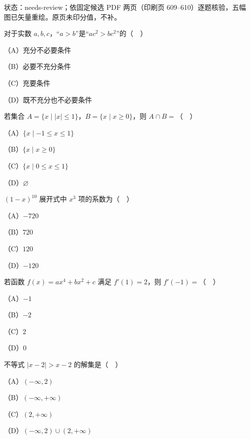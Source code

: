 

状态：needs-review；依固定候选 PDF 两页（印刷页 609–610）逐题核验，五幅图已矢量重绘。原页未印分值，不补。


\begin{question}
对于实数 $a,b,c$，“$a>b$”是“$ac^2>bc^2$”的（　）

（A）充分不必要条件

（B）必要不充分条件

（C）充要条件

（D）既不充分也不必要条件

\end{question}
\begin{question}
若集合 $A=\{x\mid |x|\leqslant1\}$，$B=\{x\mid x\geqslant0\}$，则 $A\cap B=$（　）

（A）$\{x\mid -1\leqslant x\leqslant1\}$

（B）$\{x\mid x\geqslant0\}$

（C）$\{x\mid 0\leqslant x\leqslant1\}$

（D）$\varnothing$

\end{question}
\begin{question}
$(1-x)^{10}$ 展开式中 $x^3$ 项的系数为（　）

（A）$-720$

（B）$720$

（C）$120$

（D）$-120$

\end{question}
\begin{question}
若函数 $f(x)=ax^4+bx^2+c$ 满足 $f'(1)=2$，则 $f'(-1)=$（　）

（A）$-1$

（B）$-2$

（C）$2$

（D）$0$

\end{question}
\begin{question}
不等式 $|x-2|>x-2$ 的解集是（　）

（A）$(-\infty,2)$

（B）$(-\infty,+\infty)$

（C）$(2,+\infty)$

（D）$(-\infty,2)\cup(2,+\infty)$

\end{question}
